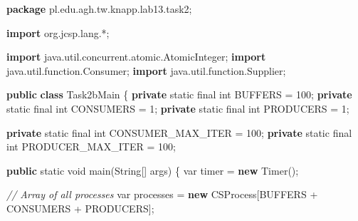 \documentclass[11pt]{article}
\newenvironment{Shaded}{}{}
\newcommand{\KeywordTok}[1]{\textcolor[rgb]{0.00,0.44,0.13}{\textbf{{#1}}}}
\newcommand{\DataTypeTok}[1]{\textcolor[rgb]{0.56,0.13,0.00}{{#1}}}
\newcommand{\DecValTok}[1]{\textcolor[rgb]{0.25,0.63,0.44}{{#1}}}
\newcommand{\CommentTok}[1]{\textcolor[rgb]{0.38,0.63,0.69}{\textit{{#1}}}}
\newcommand{\FunctionTok}[1]{\textcolor[rgb]{0.02,0.16,0.49}{{#1}}}
\newcommand{\NormalTok}[1]{{#1}}
\newcommand{\ImportTok}[1]{{#1}}
\newcommand{\OperatorTok}[1]{\textcolor[rgb]{0.40,0.40,0.40}{{#1}}}
\newcommand{\BuiltInTok}[1]{{#1}}
\begin{document}
    \begin{Shaded}
\begin{Highlighting}[]
\KeywordTok{package}\ImportTok{ pl}\OperatorTok{.}\ImportTok{edu}\OperatorTok{.}\ImportTok{agh}\OperatorTok{.}\ImportTok{tw}\OperatorTok{.}\ImportTok{knapp}\OperatorTok{.}\ImportTok{lab13}\OperatorTok{.}\ImportTok{task2}\OperatorTok{;}

\KeywordTok{import} \ImportTok{org}\OperatorTok{.}\ImportTok{jcsp}\OperatorTok{.}\ImportTok{lang}\OperatorTok{.*;}

\KeywordTok{import} \ImportTok{java}\OperatorTok{.}\ImportTok{util}\OperatorTok{.}\ImportTok{concurrent}\OperatorTok{.}\ImportTok{atomic}\OperatorTok{.}\ImportTok{AtomicInteger}\OperatorTok{;}
\KeywordTok{import} \ImportTok{java}\OperatorTok{.}\ImportTok{util}\OperatorTok{.}\ImportTok{function}\OperatorTok{.}\ImportTok{Consumer}\OperatorTok{;}
\KeywordTok{import} \ImportTok{java}\OperatorTok{.}\ImportTok{util}\OperatorTok{.}\ImportTok{function}\OperatorTok{.}\ImportTok{Supplier}\OperatorTok{;}

\KeywordTok{public} \KeywordTok{class}\NormalTok{ Task2bMain }\OperatorTok{\{}
    \KeywordTok{private} \DataTypeTok{static} \DataTypeTok{final} \DataTypeTok{int}\NormalTok{ BUFFERS }\OperatorTok{=} \DecValTok{100}\OperatorTok{;}
    \KeywordTok{private} \DataTypeTok{static} \DataTypeTok{final} \DataTypeTok{int}\NormalTok{ CONSUMERS }\OperatorTok{=} \DecValTok{1}\OperatorTok{;}
    \KeywordTok{private} \DataTypeTok{static} \DataTypeTok{final} \DataTypeTok{int}\NormalTok{ PRODUCERS }\OperatorTok{=} \DecValTok{1}\OperatorTok{;}

    \KeywordTok{private} \DataTypeTok{static} \DataTypeTok{final} \DataTypeTok{int}\NormalTok{ CONSUMER\_MAX\_ITER }\OperatorTok{=} \DecValTok{100}\OperatorTok{;}
    \KeywordTok{private} \DataTypeTok{static} \DataTypeTok{final} \DataTypeTok{int}\NormalTok{ PRODUCER\_MAX\_ITER }\OperatorTok{=} \DecValTok{100}\OperatorTok{;}

    \KeywordTok{public} \DataTypeTok{static} \DataTypeTok{void} \FunctionTok{main}\OperatorTok{(}\BuiltInTok{String}\OperatorTok{[]}\NormalTok{ args}\OperatorTok{)} \OperatorTok{\{}
        \DataTypeTok{var}\NormalTok{ timer }\OperatorTok{=} \KeywordTok{new} \BuiltInTok{Timer}\OperatorTok{();}

        \CommentTok{// Array of all processes}
        \DataTypeTok{var}\NormalTok{ processes }\OperatorTok{=} \KeywordTok{new}\NormalTok{ CSProcess}\OperatorTok{[}\NormalTok{BUFFERS }\OperatorTok{+}\NormalTok{ CONSUMERS }\OperatorTok{+}\NormalTok{ PRODUCERS}\OperatorTok{];}


\end{Highlighting}
\end{Shaded}
\end{document}
